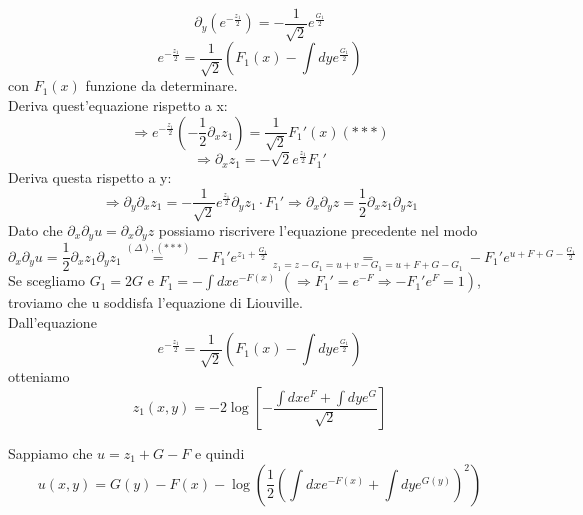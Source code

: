 \documentclass[a4paper,11pt]{report}
\begin{document}
$$
\partial_y\left(e^{-\frac{z_1}{2} }\right) = -\dfrac{1}{\sqrt{2}}e^{\frac{G_1}{2}}
$$
$$
e^{-\frac{z_1}{2}}=\dfrac{1}{\sqrt{2}}\left(F_1(x) - \int dy e^{\frac{G_1}{2}}\right)
$$
con $F_1(x)$ funzione da determinare.\\
Deriva quest'equazione rispetto a x:
$$
\Rightarrow e^{-\frac{z_1}{2}}\left(-\dfrac{1}{2}\partial_x z_1\right)=\dfrac{1}{\sqrt{2}}F_1'(x) (***)
$$
$$
\Rightarrow \partial_x z_1 = -\sqrt{2}e^{\frac{z_1}{2}}F_1'
$$
Deriva questa rispetto a y:
$$
\Rightarrow \partial_y \partial_x z_1 = -\dfrac{1}{\sqrt{2}}e^{\frac{z_1}{2}}\partial_y z_1 \cdot F_1' \Rightarrow \partial_x\partial_y z = \dfrac{1}{2}\partial_x z_1 \partial_y z_1
$$
Dato che $\partial_x\partial_y u = \partial_x\partial_y z$ possiamo riscrivere l'equazione precedente nel modo
$$
\partial_x\partial_y u =\dfrac{1}{2} \partial_x z_1 \partial_y z_1 \overset{(\Delta),(***)}{=} -F_1' e^{z_1 + \frac{G_1}{2}} \underset{z_1=z-G_1=u+v-G_1=u+F+G-G_1}{=} -F_1'e^{u+F+G-\frac{G_1}{2}}
$$
Se scegliamo $G_1=2G$ e $F_1=-\int dx e^{-F(x)}$ $(\Rightarrow F_1'=e^{-F} \Rightarrow -F_1' e^F = 1)$, troviamo che u soddisfa l'equazione di Liouville.\\
Dall'equazione
$$
e^{-\frac{z_1}{2}}=\dfrac{1}{\sqrt{2}}\left(F_1(x)-\int dy e^{\frac{G_1}{2}}\right)
$$
otteniamo
$$
z_1(x,y)=-2\log \left[-\dfrac{\int dx e^{F} + \int dy e^G}{\sqrt{2}} \right]
$$

Sappiamo che $u=z_1+G-F$ e quindi 
$$
u(x,y)=G(y)-F(x) - \log\left(\dfrac{1}{2}\left(\int dx e^{-F(x)} + \int dy e^{G(y)}\right)^2 \right)
$$
\end{document}
